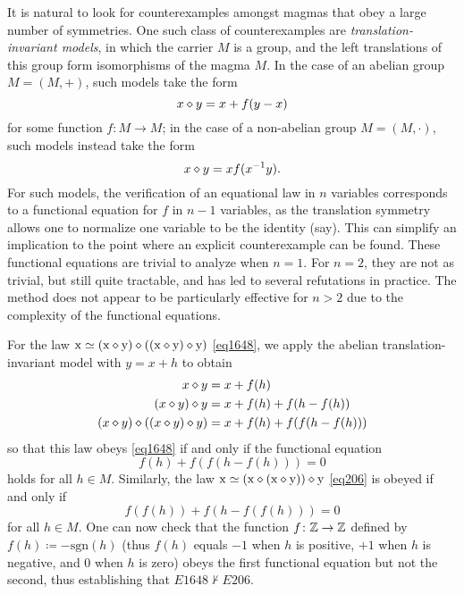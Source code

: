 It is natural to look for counterexamples amongst magmas that obey a large number of symmetries.  One such class of counterexamples are \emph{translation-invariant models}, in which the carrier $M$ is a group, and the left translations of this group form isomorphisms of the magma $M$.  In the case of an abelian group $M = (M,+)$, such models take the form
\begin{equation}\label{xop-add}
  x \diamond y = x + f(y-x)
\end{equation}
for some function $f \colon M \to M$; in the case of a non-abelian group $M = (M,\cdot)$, such models instead take the form
\begin{equation}\label{xop-mul}
x \diamond y = x f(x^{-1} y).
\end{equation}
For such models, the verification of an equational law in $n$ variables corresponds to a functional equation for $f$ in $n-1$ variables, as the translation symmetry allows one to normalize one variable to be the identity (say). This can simplify an implication to the point where an explicit counterexample can be found.  These functional equations are trivial to analyze when $n=1$.  For $n=2$, they are not as trivial, but still quite tractable, and has led to several refutations in practice.  The method does not appear to be particularly effective for $n>2$ due to the complexity of the functional equations.

\begin{example}\label{abex}  For the law $\mathrm{x} \simeq (\mathrm{x} \diamond \mathrm{y}) \diamond ((\mathrm{x} \diamond \mathrm{y}) \diamond \mathrm{y})$ \eqref{eq1648}, we apply the abelian translation-invariant model  with $y=x+h$ to obtain
\begin{align*}
  x \diamond y &= x + f(h) \\
  (x \diamond y) \diamond y &= x + f(h) + f(h-f(h)) \\
  (x \diamond y) \diamond ((x \diamond y) \diamond y) &= x + f(h) + f(f(h-f(h)))
\end{align*}
so that this law obeys \eqref{eq1648} if and only if the functional equation
$$f(h) + f(f(h-f(h))) = 0$$
holds for all $h \in M$.  Similarly, the law $\mathrm{x} \simeq (\mathrm{x} \diamond (\mathrm{x} \diamond \mathrm{y})) \diamond \mathrm{y}$ \eqref{eq206} is obeyed if and only if
$$ f(f(h)) + f(h - f(f(h))) = 0$$
for all $h \in M$.  One can now check that the function $f \colon \mathbb{Z} \to \mathbb{Z}$ defined by $f(h) \coloneqq - \mathrm{sgn}(h)$ (thus $f(h)$ equals $-1$ when $h$ is positive, $+1$ when $h$ is negative, and $0$ when $h$ is zero) obeys the first functional equation but not the second, thus establishing that $E1648 \not \vdash E206$.
\end{example}

